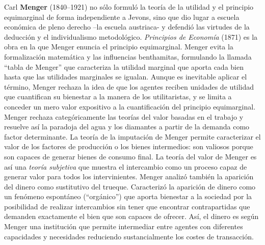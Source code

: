 \documentclass{nuevotema}
\begin{document}
Carl \textbf{Menger} (1840--1921) no sólo formuló la teoría de la utilidad y el principio equimarginal de forma independiente a Jevons, sino que dio lugar a escuela económica de pleno derecho --la escuela austriaca- y defendió las virtudes de la deducción y el individualismo metodológico. \textit{Principios de Economía} (1871) es la obra en la que Menger enuncia el principio equimarginal. Menger evita la formalización matemática y las influencias benthamitas, formulando la llamada ``tabla de Menger'' que caracteriza la utilidad marginal que aporta cada bien hasta que las utilidades marginales se igualan. Aunque es inevitable aplicar el término, Menger rechaza la idea de que los agentes reciben unidades de utilidad que cuantifican su bienestar a la manera de los utilitaristas, y se limita a conceder un mero valor expositivo a la cuantificación del principio equimarginal. Menger rechaza categóricamente las teorías del valor basadas en el trabajo y resuelve así la paradoja del agua y los diamantes a partir de la demanda como factor determinante. La teoría de la imputación de Menger permite caracterizar el valor de los factores de producción o los bienes intermedios: son valiosos porque son capaces de generar bienes de consumo final. La teoría del valor de Menger es así una \textit{teoría subjetiva} que muestra el intercambio como un proceso capaz de generar valor para todos los intervinientes. Menger analizó también la aparición del dinero como sustitutivo del trueque. Caracterizó la aparición de dinero como un fenómeno espontáneo (``orgánico'') que aporta bienestar a la sociedad por la posibilidad de realizar intercambios sin tener que encontrar contrapartidas que demanden exactamente el bien que son capaces de ofrecer. Así, el dinero es según Menger una institución que permite intermediar entre agentes con diferentes capacidades y necesidades reduciendo sustancialmente los costes de transacción. 
\end{document}
